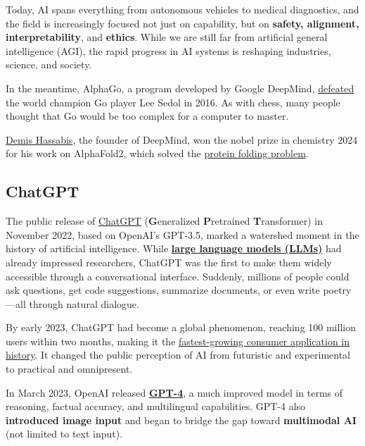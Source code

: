 \documentclass[
]{book}
\begin{document}
Today, AI spans everything from autonomous vehicles to medical diagnostics,
and the field is increasingly focused not just on capability,
but on \textbf{safety, alignment, interpretability}, and \textbf{ethics}.
While we are still far from artificial general intelligence (AGI),
the rapid progress in AI systems is reshaping industries, science, and society.

In the meantime, AlphaGo, a program developed by Google DeepMind,
\href{https://de.wikipedia.org/wiki/AlphaGo_gegen_Lee_Sedol}{defeated}
the world champion Go player Lee Sedol in 2016. As with chess,
many people thought that Go would be too complex for a computer to master.

\href{https://www.nobelprize.org/prizes/chemistry/2024/hassabis/facts/}{Demis Hassabis},
the founder of DeepMind,
won the nobel prize in chemistry 2024 for his work on AlphaFold2, which
solved the \href{https://pmc.ncbi.nlm.nih.gov/articles/PMC2443096/\#:~:text=The\%20protein\%20folding\%20problem\%20is,first\%20atomic\%2Dresolution\%20protein\%20structures.}{protein folding problem}.

\subsection{ChatGPT}\label{chatgpt}

The public release of \href{https://openai.com/index/chatgpt/}{ChatGPT}
(\textbf{G}eneralized \textbf{P}retrained \textbf{T}ransformer) in November 2022, based on OpenAI's GPT-3.5,
marked a watershed moment in the history of artificial intelligence.
While \href{https://en.wikipedia.org/wiki/Large_language_model}{\textbf{large language models (LLMs)}}
had already impressed researchers,
ChatGPT was the first to make them widely accessible through a conversational interface.
Suddenly, millions of people could ask questions,
get code suggestions, summarize documents, or even write poetry---all through natural dialogue.

By early 2023, ChatGPT had become a global phenomenon, reaching 100 million users within two months,
making it the \href{https://cdn.buttercms.com/output=f:webp/lgJEtn9sTLu1AflcBKDy}{fastest-growing consumer application in history}.
It changed the public perception
of AI from futuristic and experimental to practical and omnipresent.

In March 2023, OpenAI released \href{https://arxiv.org/pdf/2303.08774}{\textbf{GPT-4}},
a much improved model in terms of reasoning, factual accuracy,
and multilingual capabilities. GPT-4 also \textbf{introduced image input}
and began to bridge the gap toward \textbf{multimodal AI} (not limited to text input).
\end{document}
